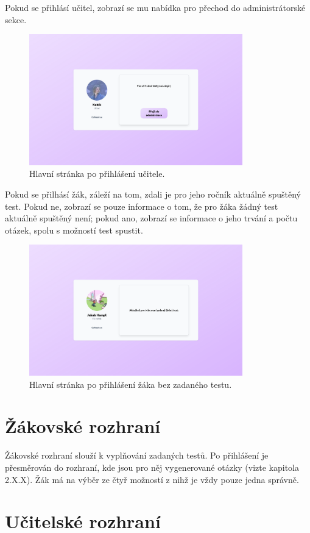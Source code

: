 Pokud se přihlásí učitel, zobrazí se mu nabídka pro přechod do administrátorské sekce.

\begin{figure}[H]
    \centering
    \includegraphics[width=350px]{images/01design/teacher.png}
    \caption{Hlavní stránka po přihlášení učitele.}
\end{figure}

Pokud se přilhásí žák, záleží na tom, zdali je pro jeho ročník aktuálně spuštěný test. Pokud ne, zobrazí se pouze informace o tom, že pro žáka žádný test aktuálně spuštěný není; pokud ano, zobrazí se informace o jeho trvání a počtu otázek, spolu s možností test spustit.

\begin{figure}[H]
    \centering
    \includegraphics[width=350px]{images/01design/student-no-test.png}
    \caption{Hlavní stránka po přihlášení žáka bez zadaného testu.}
\end{figure}

\section{Žákovské rozhraní}

Žákovské rozhraní slouží k vyplňování zadaných testů. Po přihlášení je přesměrován do rozhraní, kde jsou pro něj vygenerované otázky (vizte kapitola 2.X.X). Žák má na výběr ze čtyř možností z nihž je vždy pouze jedna správně.

\section{Učitelské rozhraní}